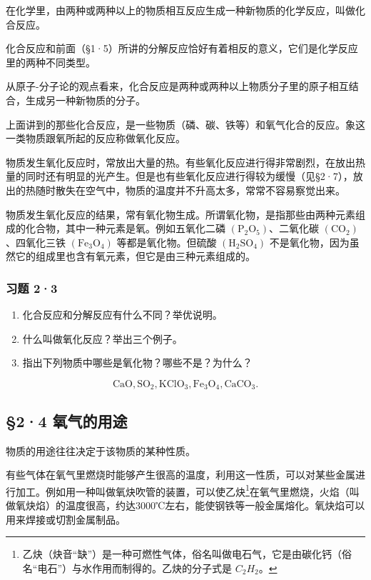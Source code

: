 在化学里，由两种或两种以上的物质相互反应生成一种新物质的化学反应，叫做化合反应。

化合反应和前面（§1·5）所讲的分解反应恰好有着相反的意义，它们是化学反应里的两种不同类型。

从原子-分子论的观点看来，化合反应是两种或两种以上物质分子里的原子相互结合，生成另一种新物质的分子。

上面讲到的那些化合反应，是一些物质（磷、碳、铁等）和氧气化合的反应。象这一类物质跟氧所起的反应称做氧化反应。

物质发生氧化反应时，常放出大量的热。有些氧化反应进行得非常剧烈，在放出热量的同时还有明显的光产生。但是也有些氧化反应进行得较为缓慢（见§2·7），放出的热随时散失在空气中，物质的温度并不升高太多，常常不容易察觉出来。

物质发生氧化反应的结果，常有氧化物生成。所谓氧化物，是指那些由两种元素组成的化合物，其中一种元素是氧。例如五氧化二磷
\(\left(\mathrm{P}_{2}\mathrm{O}_{5}\right)\)、二氧化碳
\(\left(\mathrm{CO}_{2}\right)\)、四氧化三铁
\(\left(\mathrm{Fe}_{3}\mathrm{O}_{4}\right)\) 等都是氧化物。但硫酸
\(\left(\mathrm{H}_{2}\mathrm{SO}_{4}\right)\)
不是氧化物，因为虽然它的组成里也含有氧元素，但它是由三种元素组成的。

\subsubsection{习题 2·3}

\begin{enumerate}
\item
  化合反应和分解反应有什么不同？举优说明。
\item
  什么叫做氧化反应？举出三个例子。
\item
  指出下列物质中哪些是氧化物？哪些不是？为什么？
\end{enumerate}

\[
\mathrm{CaO}, \mathrm{SO}_{2}, \mathrm{KClO}_{3}, \mathrm{Fe}_{3}\mathrm{O}_{4}, \mathrm{CaCO}_{3}.
\]

\subsection{§2·4 氧气的用途}

物质的用途往往决定于该物质的某种性质。

有些气体在氧气里燃烧时能够产生很高的温度，利用这一性质，可以对某些金属进行加工。例如用一种叫做氧炔吹管的装置，可以使乙炔\footnote{乙炔（炔音``缺''）是一种可燃性气体，俗名叫做电石气，它是由碳化钙（俗名``电石''）与水作用而制得的。乙炔的分子式是
  \(C_{2}H_{2}\)。}在氧气里燃烧，火焰（叫做氧炔焰）的温度很高，约达3000℃左右，能使钢铁等一般金属熔化。氧炔焰可以用来焊接或切割金属制品。

